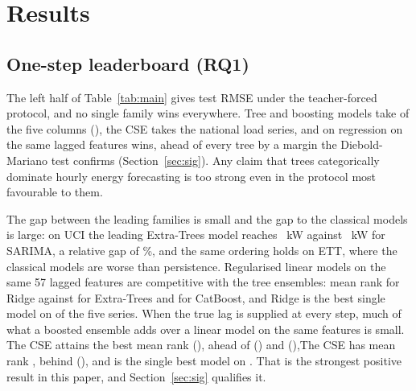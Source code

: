 \documentclass[journal]{IEEEtran}
\begin{document}
\begin{table}[!tb]
\caption{Test RMSE on the fixed 80/20 split under both protocols; best per column in bold, dashes for the classical fits skipped on OPSD-N. Units: kW (UCI, OPSD-H), MW (OPSD-N), degrees (ETT). The recursive half is one rollout over the whole test window from the end of training. Mean rank is over the \nCommonOne{} models present on all five datasets, with ranks averaged within ties. \recTieNote\ifnum\nPending>0{} Entries in red are CSE results from the previous solver on \pendingList{} and will be replaced once those series are refit.\fi}
\label{tab:main}
\centering
\scriptsize
\setlength{\tabcolsep}{3pt}

\end{table}

\section{Results}
\subsection{One-step leaderboard (RQ1)}
The left half of Table~\ref{tab:main} gives test RMSE under the teacher-forced protocol, and no single family wins everywhere. Tree and boosting models take \nTreeWinsOne{} of the five columns (\treeWinsOneList), the CSE takes the national load series, and on \linearWinsOneList{} \linearWinsOneModel{} regression on the same lagged features wins, ahead of every tree by a margin the Diebold-Mariano test confirms (Section~\ref{sec:sig}). Any claim that trees categorically dominate hourly energy forecasting is too strong even in the protocol most favourable to them.

The gap between the leading families is small and the gap to the classical models is large: on UCI the leading Extra-Trees model reaches \bestOneUCIVal~kW against \bestRecUCIVal~kW for SARIMA, a relative gap of \uciGapSarimaET\%, and the same ordering holds on ETT, where the classical models are worse than persistence. Regularised linear models on the same 57 lagged features are competitive with the tree ensembles: mean rank \ridgeRankOne{} for Ridge against \etRankOne{} for Extra-Trees and \catRankOne{} for CatBoost, and Ridge is the best single model on \nLinearWinsOne{} of the five series. When the true lag is supplied at every step, much of what a boosted ensemble adds over a linear model on the same features is small. \ifnum{} The CSE attains the best mean rank (\cseRankOne), ahead of \bestOtherRankOneName{} (\bestOtherRankOne) and \secondOtherRankOneName{} (\secondOtherRankOne),\else The CSE has mean rank \cseRankOne, behind \bestOtherRankOneName{} (\bestOtherRankOne),\fi{} and is the single best model on \winListOne. That is the strongest positive result in this paper, and Section~\ref{sec:sig} qualifies it.
\end{document}
